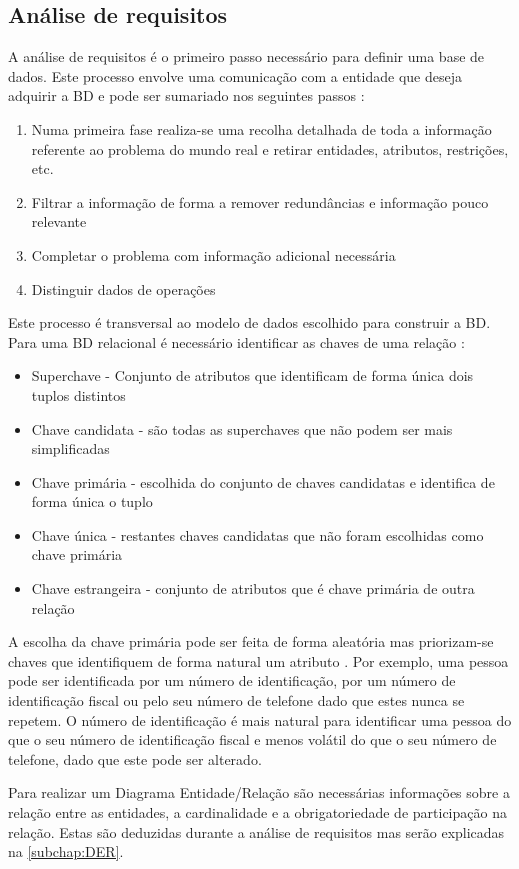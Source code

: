 \documentclass[11pt,twoside,a4paper]{report}
\begin{document}
\subsection{Análise de requisitos}
A análise de requisitos é o primeiro passo necessário para definir uma base de dados. Este processo envolve uma comunicação com a entidade que deseja adquirir a BD e pode ser sumariado nos seguintes passos \cite{analise_requisitos}:
\begin{enumerate}
	\item Numa primeira fase realiza-se uma recolha detalhada de toda a informação referente ao problema do mundo real e retirar entidades, atributos, restrições, etc.
	\item Filtrar a informação de forma a remover redundâncias e informação pouco relevante
	\item Completar o problema com informação adicional necessária
	\item Distinguir dados de operações
\end{enumerate}
Este processo é transversal ao modelo de dados escolhido para construir a BD. Para uma BD relacional é necessário identificar as chaves de uma relação \cite{chaves}:
\begin{itemize}
	\item Superchave - Conjunto de atributos que identificam de forma única dois tuplos distintos
	\item Chave candidata - são todas as superchaves que não podem ser mais simplificadas
	\item Chave primária - escolhida do conjunto de chaves candidatas e identifica de forma única o tuplo
	\item Chave única - restantes chaves candidatas que não foram escolhidas como chave primária
	\item Chave estrangeira - conjunto de atributos que é chave primária de outra relação
\end{itemize}
A escolha da chave primária pode ser feita de forma aleatória mas priorizam-se chaves que identifiquem de forma natural um atributo \cite{chaves}. Por exemplo, uma pessoa pode ser identificada por um número de identificação, por um número de identificação fiscal ou pelo seu número de telefone dado que estes nunca se repetem. O número de identificação é mais natural para identificar uma pessoa do que o seu número de identificação fiscal e menos volátil do que o seu número de telefone, dado que este pode ser alterado.\par 
Para realizar um Diagrama Entidade/Relação são necessárias informações sobre a relação entre as entidades, a cardinalidade e a obrigatoriedade de participação na relação. Estas são deduzidas durante a análise de requisitos mas serão explicadas na \autoref{subchap:DER}.
\end{document}
